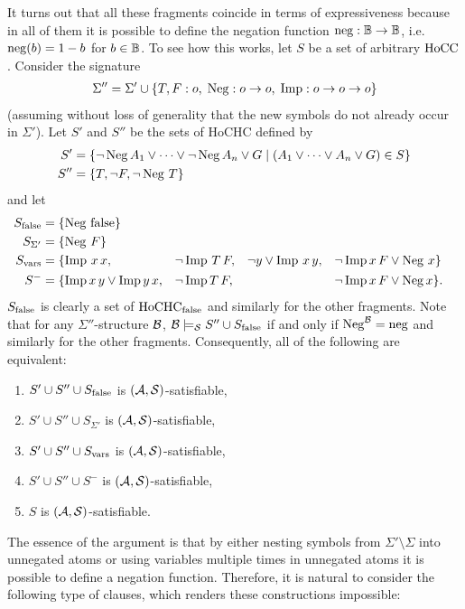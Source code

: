 \documentclass[a4paper,twoside,notitlepage,openright,11pt]{report}
\begin{document}
It turns out that all these fragments coincide in terms of expressiveness because in all of them it is possible to define the negation function $\operatorname{neg}:\mathbb B\to\mathbb B$, i.e.\ $\operatorname{neg}(b)=1-b$ for $b\in\mathbb B$.
To see how this works, let $S$ be a set of arbitrary $\operatorname{HoCC}$.
Consider the signature
\begin{align*}
  \Sigma''=\Sigma'\cup\{T,F: o,\;\operatorname{Neg}: o\to o,\;\operatorname{Imp}: o\to o\to o\}
\end{align*}
(assuming without loss of generality that the new symbols do not already occur in $\Sigma'$).
Let $S'$ and $S''$ be the sets of HoCHC defined by
\begin{align*}
  S'&=\{\neg\operatorname{Neg} A_1\lor\cdots\lor\neg\operatorname{Neg} A_n\lor G\mid (A_1\lor\cdots\lor A_n\lor G)\in S\}\\
  S''&=\{T,\neg F,\neg\operatorname{Neg}\,T\}
\end{align*}
and let
\begin{align*}
  S_{\operatorname{false}}&=\{\operatorname{Neg}\,\operatorname{false}\}\\
  S_{\Sigma'}&=\{\operatorname{Neg}\,F\}\\
  S_{\operatorname{vars}}&=\{\operatorname{Imp}\,x\,x,&&\neg\operatorname{Imp}\,T\,F,&&\neg y\lor\operatorname{Imp}\,x\,y,&&\neg\operatorname{Imp} x\,F\lor\operatorname{Neg}\,x\}\\
  S^-&=\{\operatorname{Imp} x\,y\lor\operatorname{Imp} y\,x,&&\neg\operatorname{Imp} T\,F,&&&&\neg\operatorname{Imp} x\,F\lor\operatorname{Neg} x\}.
\end{align*}
$S_{\operatorname{false}}$ is clearly a set of $\operatorname{HoCHC}_{\operatorname{false}}$ and similarly for the other fragments.
Note that for any $\Sigma''$-structure $\mathcal B$, 
$\mathcal B\models_\mathcal S S''\cup S_{\operatorname{false}}$ if and only if $\operatorname{Neg}^\mathcal B=\operatorname{neg}$ and similarly for the other fragments. Consequently, all of the following are equivalent:
\begin{enumerate}[noitemsep]
\item $S'\cup S''\cup S_{\operatorname{false}}$ is $(\mathcal A,\mathcal S)$-satisfiable,
\item $S'\cup S''\cup S_{\Sigma'}$ is $(\mathcal A,\mathcal S)$-satisfiable,
\item $S'\cup S''\cup S_{\operatorname{vars}}$ is $(\mathcal A,\mathcal S)$-satisfiable,
\item $S'\cup S''\cup S^-$ is $(\mathcal A,\mathcal S)$-satisfiable,
\item $S$ is $(\mathcal A,\mathcal S)$-satisfiable.
\end{enumerate}
The essence of the argument is that by either nesting symbols from $\Sigma'\setminus\Sigma$ into unnegated atoms or using variables multiple times in unnegated atoms it is possible to define a negation function. Therefore, it is natural to consider the following type of clauses, which renders these constructions impossible:
\end{document}
